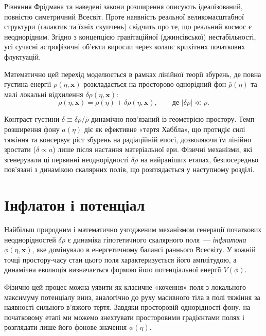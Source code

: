 \documentclass[12pt, a4paper]{article}
\begin{document}
Рівняння Фрідмана та наведені закони розширення описують ідеалізований, повністю симетричний Всесвіт. Проте наявність реальної великомасштабної структури (галактик та їхніх скупчень) свідчить про те, що реальний космос є неоднорідним. Згідно з концепцією гравітаційної (джинсівської) нестабільності, усі сучасні астрофізичні об'єкти виросли через колапс крихітних початкових флуктуацій.

Математично цей перехід моделюється в рамках лінійної теорії збурень, де повна густина енергії $\rho(\eta, \mathbf{x})$ розкладається на просторово однорідний фон $\bar{\rho}(\eta)$ та малі локальні відхилення $\delta\rho(\eta, \mathbf{x})$:
\begin{equation*}
  \rho(\eta, \mathbf{x}) = \bar{\rho}(\eta) + \delta\rho(\eta, \mathbf{x}),
  \qquad \text{де } |\delta\rho| \ll \bar{\rho}.
\end{equation*}

Контраст густини $\delta \equiv \delta\rho / \bar{\rho}$ динамічно пов'язаний із геометрією простору. Темп розширення фону $a(\eta)$ діє як ефективне «тертя Хаббла», що протидіє силі тяжіння та консервує ріст збурень на радіаційній епосі, дозволяючи їм лінійно зростати ($\delta \propto a$) лише після настання матеріальної ери. Фізичні механізми, які згенерували ці первинні неоднорідності $\delta\rho$ на найраніших етапах, безпосередньо пов'язані з динамікою скалярних полів, що розглядається у наступному розділі.

\section{Інфлатон і потенціал}

Найбільш природним і математично узгодженим механізмом генерації початкових неоднорідностей $\delta\rho$ є динаміка гіпотетичного скалярного поля~--- \emph{інфлатона} $\phi(\eta, \mathbf{x})$, яке домінувало в енергетичному балансі раннього Всесвіту. У кожній точці простору-часу стан цього поля характеризується його амплітудою, а динамічна еволюція визначається формою його потенціальної енергії $V(\phi)$.

Фізично цей процес можна уявити як класичне «кочення» поля з локального максимуму потенціалу вниз, аналогічно до руху масивного тіла в полі тяжіння за наявності сильного в'язкого тертя. Завдяки просторовій однорідності фону, на початковому етапі ми можемо знехтувати просторовими градієнтами полях і розглядати лише його фонове значення $\phi(\eta)$.
\end{document}
